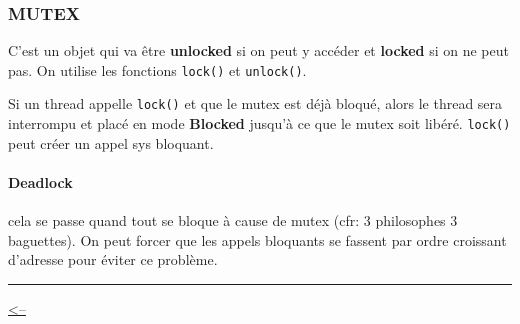 \subsubsection{MUTEX}\label{mutex}

C'est un objet qui va être \textbf{unlocked} si on peut y accéder et
\textbf{locked} si on ne peut pas. On utilise les fonctions
\texttt{lock()} et \texttt{unlock()}.

Si un thread appelle \texttt{lock()} et que le mutex est déjà bloqué,
alors le thread sera interrompu et placé en mode \textbf{Blocked}
jusqu'à ce que le mutex soit libéré. \texttt{lock()} peut créer un appel
sys bloquant.

\paragraph{Deadlock}\label{deadlock}

cela se passe quand tout se bloque à cause de mutex (cfr: 3 philosophes
3 baguettes). On peut forcer que les appels bloquants se fassent par
ordre croissant d'adresse pour éviter ce problème.

\begin{center}\rule{0.5\linewidth}{0.5pt}\end{center}

\href{../README.md}{\textless--}
